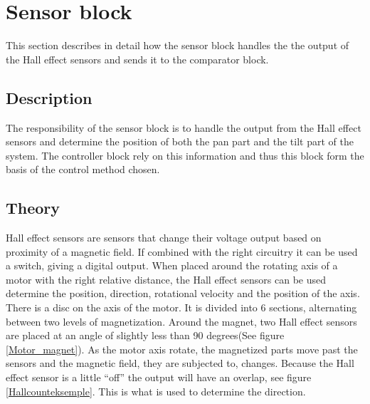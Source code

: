 \section{Sensor block}
This section describes in detail how the sensor block handles the the output of the Hall effect sensors and sends it to the comparator block.

\subsection{Description}
The responsibility of the sensor block is to handle the output from the Hall effect sensors and determine the position of both the pan part and the tilt part of the system. The controller block rely on this information and thus this block form the basis of the control method chosen.

\subsection{Theory}
Hall effect sensors are sensors that change their voltage output based on proximity of a magnetic field. If combined with the right circuitry it can be used a switch, giving a digital output. When placed around the rotating axis of a motor with the right relative distance, the Hall effect sensors can be used determine the position, direction, rotational velocity and the position of the axis.
There is a disc on the axis of the motor. It is divided into 6 sections, alternating between two levels of magnetization. Around the magnet, two Hall effect sensors are placed at an angle of slightly less than 90 degrees(See figure \ref{Motor_magnet}). As the motor axis rotate, the magnetized parts move past the sensors and the magnetic field, they are subjected to, changes. Because the Hall effect sensor is a little “off” the output will have an overlap, see figure \ref{Hallcounteksemple}. This is what is used to determine the direction.

